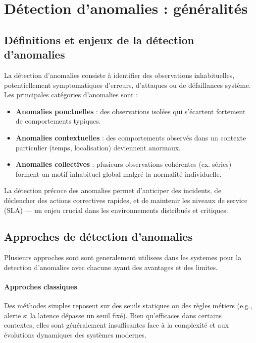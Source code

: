 \documentclass[a4paper,12pt]{report}
\begin{document}
\section{Détection d’anomalies : généralités}

\subsection{Définitions et enjeux de la détection d’anomalies}

La détection d’anomalies consiste à \cite{muruti2023_detectio_anomalies_generalite} identifier des observations inhabituelles, potentiellement symptomatiques d’erreurs, d’attaques ou de défaillances système.  
Les principales catégories d’anomalies sont :

\begin{itemize}
  \item \textbf{Anomalies ponctuelles} : des observations isolées qui s’écartent fortement de comportements typiques.
  \item \textbf{Anomalies contextuelles} : des comportements observés dans un contexte particulier (temps, localisation) deviennent anormaux.
  \item \textbf{Anomalies collectives} : plusieurs observations cohérentes (ex. séries) forment un motif inhabituel global malgré la normalité individuelle.
\end{itemize}

La détection précoce des anomalies permet d’anticiper des incidents, de déclencher des actions correctives rapides, et de maintenir les niveaux de service (SLA) — un enjeu crucial dans les environnements distribués et critiques.

\subsection{Approches de détection d’anomalies}
Plusieurs approches sont sont generalement utilisees dans les systemes pour la detection d'anomalies avec chacune ayant des avantages et des limites.
\paragraph{Approches classiques}  
Des méthodes simples reposent sur des seuils statiques ou des règles métiers (e.g., alerte si la latence dépasse un seuil fixé). Bien qu’efficaces dans certains contextes, elles sont généralement insuffisantes face à la complexité et aux évolutions dynamiques des systèmes modernes.
\end{document}
